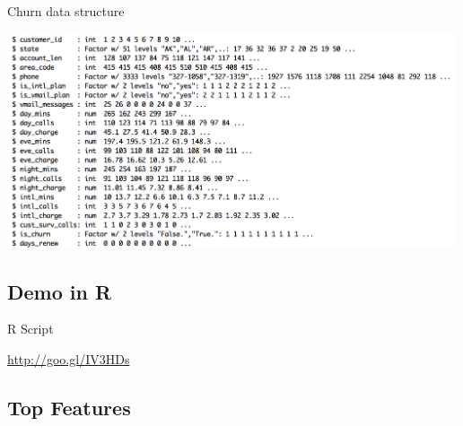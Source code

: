 \documentclass[10pt]{beamer}
\begin{document}
    \begin{frame}{Churn data structure}
      \begin{center}
        \includegraphics[height=180pt]{../graphs/dataset_churn_str}
      \end{center}
    \end{frame}

  \subsection{Demo in R}

    \begin{frame}{R Script}
        \begin{center}
          {\large \url{http://goo.gl/IV3HDs}}
        \end{center}
    \end{frame}
    
  \subsection{Top Features}
  
\end{document}
